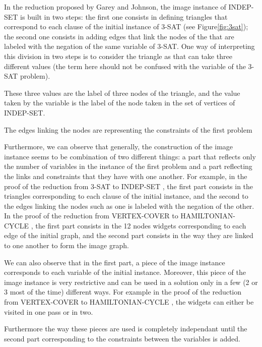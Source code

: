 \noindent\hrulefill

In the reduction proposed by Garey and Johnson\cite{garey}, the image
instance of INDEP-SET is built in two steps: the first one consists in
defining triangles that correspond to each clause of the initial
instance of 3-SAT (see Figure\ref{fig:3sat}); the second one consists
in adding edges that link the nodes of the \widgets that are labeled
with the negation of the same variable of 3-SAT. One way of
interpreting this division in two steps is to consider the triangle
\widgets as \variables that can take three different values (the
\variable term here should not be confused with the variable of the
3-SAT problem). 

These three values are the label of three nodes of the
triangle, and the value taken by the variable is the label of the node
taken in the set of vertices of INDEP-SET.

The edges linking the nodes are representing
the constraints of the first problem

Furthermore, we can observe that generally, the construction of the
image instance seems to be combination of two different things: a part
that reflects only the number of variables in the instance of the
first problem and a part reflecting the links and constraints that
they have with one another.  For example, in the proof of the
reduction from 3-SAT to INDEP-SET \cite{polytech}, the first part
consists in the triangles corresponding to each clause of the initial
instance, and the second to the edges linking the nodes such as one is
labeled with the negation of the other. In the proof of the reduction
from VERTEX-COVER to HAMILTONIAN-CYCLE \cite{polytech}, the first part
consists in the 12 nodes widgets corresponding to each edge of the
initial graph, and the second part consists in the way they are linked
to one another to form the image graph.

We can also observe that in the first part, a piece of the image
instance corresponds to each variable of the initial
instance. Moreover, this piece of the image instance is very
restrictive and can be used in a solution only in a few (2 or 3 most
of the time) different ways. For example in the proof of the reduction
from VERTEX-COVER to HAMILTONIAN-CYCLE \cite{polytech}, the widgets
can either be visited in one pass or in two.

Furthermore the way these pieces are used is completely independant
until the second part corresponding to the constraints between the
variables is added.

